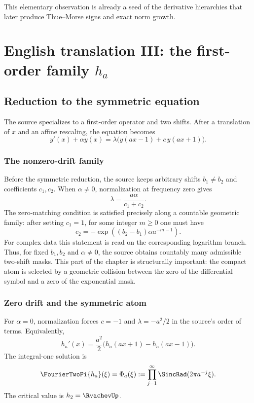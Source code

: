 \documentclass[11pt,oneside]{article}
\numberwithin{equation}{section}
\theoremstyle{definition}
\theoremstyle{remark}
\begin{document}
This elementary observation is already a seed of the derivative hierarchies
that later produce Thue--Morse signs and exact norm growth.

\section{English translation III: the first-order family \texorpdfstring{$h_a$}{h-a}}

\subsection{Reduction to the symmetric equation}

The source specializes to a first-order operator and two shifts.  After a
translation of $x$ and an affine rescaling, the equation becomes
\begin{equation}\label{p6:eq:first-order-general}
 y'(x)+\alpha y(x)=\lambda\bigl(y(ax-1)+c\,y(ax+1)\bigr).
\end{equation}

\subsubsection{The nonzero-drift family}
Before the symmetric reduction, the source keeps arbitrary shifts $b_1\ne b_2$
and coefficients $c_1,c_2$.  When $\alpha\ne0$, normalization at frequency
zero gives
\begin{equation}\label{p6:eq:alpha-nonzero-lambda}
 \lambda=\frac{a\alpha}{c_1+c_2}.
\end{equation}
The zero-matching condition is satisfied precisely along a countable geometric
family: after setting $c_1=1$, for some integer $m\ge0$ one must have
\begin{equation}\label{p6:eq:alpha-nonzero-c2}
 c_2=-\exp\!\left((b_2-b_1)\alpha a^{-m-1}\right).
\end{equation}
For complex data this statement is read on the corresponding logarithm branch.
Thus, for fixed $b_1,b_2$ and $\alpha\ne0$, the source obtains countably many
admissible two-shift masks.  This part of the chapter is structurally important:
the compact atom is selected by a geometric collision between the zero of the
differential symbol and a zero of the exponential mask.

\subsubsection{Zero drift and the symmetric atom}
For $\alpha=0$, normalization forces $c=-1$ and $\lambda=-a^2/2$ in the
source's order of terms.  Equivalently,
\begin{equation}\label{p6:eq:ha-diffeq}
 h_a'(x)=\frac{a^2}{2}\bigl(h_a(ax+1)-h_a(ax-1)\bigr).
\end{equation}
The integral-one solution is
\begin{equation}\label{p6:eq:ha-fourier}
 \FourierTwoPi{h_a}(\xi)=\Phi_a(\xi)
 :=\prod_{j=1}^{\infty}\SincRad(2\pi a^{-j}\xi).
\end{equation}
The critical value is $h_2=\RvachevUp$.
\end{document}
